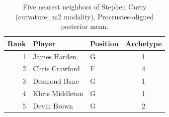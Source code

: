 \begin{table}[htbp]
  \centering\small
  \begin{tabular}{rllc}
    \toprule
    Rank & Player & Position & Archetype \\
    \midrule
    1 & James Harden & G & 1 \\
    2 & Chris Crawford & F & 4 \\
    3 & Desmond Bane & G & 1 \\
    4 & Khris Middleton & G & 1 \\
    5 & Devin Brown & G & 2 \\
    \bottomrule
  \end{tabular}
  \caption{Five nearest neighbors of Stephen Curry (curvature_m2 modality), Procrustes-aligned posterior mean.}
  \label{tab:Stephen_Curry_neighbors_curvature_m2}
\end{table}

